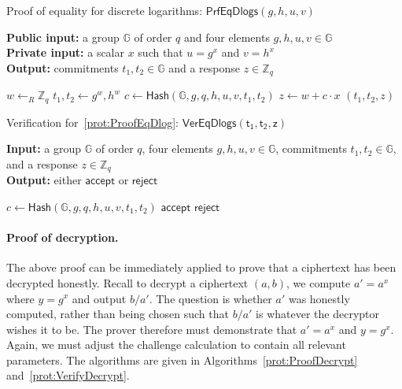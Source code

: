 \documentclass[12pt,a4paper]{article}
\theoremstyle{definition}
\begin{document}
\begin{algorithm}\caption{Proof of equality for discrete logarithms: $\mathsf{PrfEqDlogs}(g, h, u, v)$}\label{prot:ProofEqDlog}
    \textbf{Public input:} a group $\mathbb{G}$ of order $q$ and four elements $g, h, u, v\in\mathbb{G}$\\
    \textbf{Private input:} a scalar $x$ such that $u = g^x$ and $v = h^x$\\
    \textbf{Output:} commitments $t_1, t_2\in\mathbb{G}$ and a response $z\in\mathbb{Z}_q$
    \begin{algorithmic}[1]
        \State $w\leftarrow_R\mathbb{Z}_q$
        \State $t_1, t_2 \gets g^w, h^w$
        \State $c \gets \mathsf{Hash}(\mathbb{G}, g, q, h, u, v, t_1, t_2)$
        \State $z \gets w+c\cdot x$
        \State \Return $(t_1, t_2, z)$
    \end{algorithmic}
\end{algorithm}
\begin{algorithm}\caption{Verification for~\ref{prot:ProofEqDlog}: $\mathsf{VerEqDlogs(t_1, t_2, z)}$}\label{prot:VerifyEqDlog}
    \textbf{Input:} a group $\mathbb{G}$ of order $q$, four elements $g, h, u, v\in\mathbb{G}$, commitments $t_1, t_2\in\mathbb{G}$, and a response $z\in\mathbb{Z}_q$\\
    \textbf{Output:} either $\mathsf{accept}$ or $\mathsf{reject}$
    \begin{algorithmic}[1]
        \State $c \gets \mathsf{Hash}(\mathbb{G}, g, q, h, u, v, t_1, t_2)$
            \State \Return $\mathsf{accept}$
        \Else
            \State \Return $\mathsf{reject}$
        \EndIf
    \end{algorithmic}
\end{algorithm}

\paragraph{Proof of decryption.}
The above proof can be immediately applied to prove that a ciphertext has been decrypted honestly. Recall to decrypt a ciphertext $(a, b)$, we compute $a' = a^x$ where $y=g^x$ and output $b/a'$. The question is whether $a'$ was honestly computed, rather than being chosen such that $b/a'$ is whatever the decryptor wishes it to be. The prover therefore must demonstrate that $a'=a^x$ and $y=g^x$. Again, we must adjust the challenge calculation to contain all relevant parameters. The algorithms are given in Algorithms~\ref{prot:ProofDecrypt} and~\ref{prot:VerifyDecrypt}.
\end{document}
